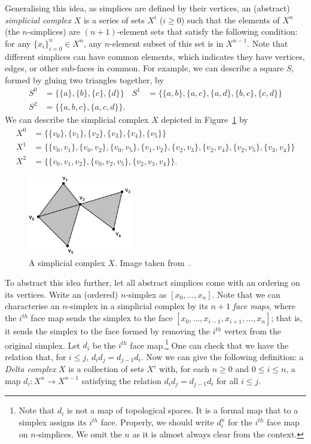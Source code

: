 \documentclass[a4paper,11pt,leqno]{article}
\theoremstyle{definition}
\begin{document}
Generalising this idea, as simplices are defined by their vertices, an (abstract) \emph{simplicial complex} $X$ is a series of sets $X^i$ ($i\geq 0$) such that the elements of $X^n$ (the $n$-simplices) are $(n+1)$-element sets that satisfy the following condition:
for any $\{x_i\}_{i=0}^n\in X^n$, any $n$-element subset of this set is in $X^{n-1}$.
Note that different simplices can have common elements, which indicates they have vertices, edges, or other sub-faces in common.
For example, we can describe a square $S$, formed by gluing two triangles together, by
\begin{align*}
S^0	&= \{\{a\},\{b\},\{c\},\{d\}\} & S^1	&= \{\{a, b\}, \{a, c\}, \{a, d\}, \{b, c\}, \{c, d\}\}\\
S^2	&= \{\{a,b,c\}, \{a,c,d\}\}.
\end{align*}
We can describe the simplicial complex $X$ depicted in Figure~\ref{fig_simplicial_complex} by
\begin{align*}
X^0	&= \{\{v_0\}, \{v_1\}, \{v_2\}, \{v_3\}, \{v_4\}, \{v_5\}\}\\
 X^1	&= \{\{v_0, v_1\}, \{v_0, v_2\}, \{v_0, v_5\}, \{v_1, v_2\}, \{v_2, v_3\}, \{v_2, v_4\}, \{v_2, v_5\}, \{v_3, v_4\}\}\\
 X^2	&= \{\{v_0, v_1, v_2\}, \{v_0, v_2, v_5\}, \{v_2, v_3, v_4\}\}.
\end{align*}

\begin{figure}
	\centering
	\includegraphics[width=0.4\textwidth]{figures/simp1.jpg}
	\caption{A simplicial complex $X$. Image taken from~\cite{Friedman08}.}
	\label{fig_simplicial_complex}
\end{figure}

To abstract this idea further, let all abstract simplices come with an ordering on its vertices.
Write an (ordered) $n$-simplex as $[x_0,\dots,x_n]$.
Note that we can characterise an $n$-simplex in a simplicial complex by its $n+1$ \emph{face maps}, where the $i^{th}$ face map sends the simplex to the face $[x_0,\dots, x_{i-1},x_{i+1},\dots, x_n]$; that is, it sends the simplex to the face formed by removing the $i^{th}$ vertex from the original simplex.
Let $d_i$ be the $i^{th}$ face map.\footnote{
Note that $d_i$ is not a map of topological spaces. It is a formal map that to a simplex assigns its $i^{th}$ face.
Properly, we should write $d_i^n$ for the $i^{th}$ face map on $n$-simplices. We omit the $n$ as it is almost always clear from the context.
}
One can check that we have the relation that, for $i \leq j$, $d_id_j = d_{j-1}d_i$.
Now we can give the following definition: a \emph{Delta complex} $X$ is a collection of sets $X^i$ with, for each $n\geq 0$ and $0\leq i\leq n$, a map $d_i: X^{n}\to X^{n-1}$ satisfying the relation $d_id_j = d_{j-1}d_i$ for all $i\leq j$.
\end{document}
